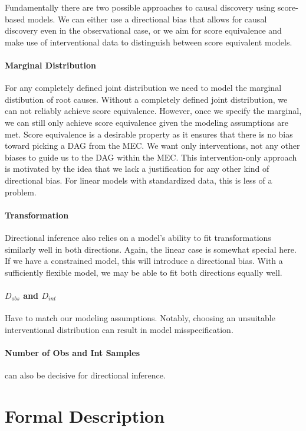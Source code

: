 \documentclass{article}
\begin{document}
Fundamentally there are two possible approaches to causal discovery using score-based models. We can either use a directional bias that allows for causal discovery even in the observational case, or we aim for score equivalence and make use of interventional data to distinguish between score equivalent models.

\paragraph{Marginal Distribution}
For any completely defined joint distribution we need to model the marginal distibution of root causes. Without a completely defined joint distribution, we can not reliably achieve score equivalence. However, once we specify the marginal, we can still only achieve score equivalence given the modeling assumptions are met. Score equivalence is a desirable property as it ensures that there is no bias toward picking a DAG from the MEC. We want only interventions, not any other biases to guide us to the DAG within the MEC. This intervention-only approach is motivated by the idea that we lack a justification for any other kind of directional bias. For linear models with standardized data, this is less of a problem.

\paragraph{Transformation}
Directional inference also relies on a model's ability to fit transformations similarly well in both directions. Again, the linear case is somewhat special here. If we have a constrained model, this will introduce a directional bias. With a sufficiently flexible model, we may be able to fit both directions equally well.

\paragraph{$D_{obs}$ and $D_{int}$}
Have to match our modeling assumptions. Notably, choosing an unsuitable interventional distribution can result in model misspecification.

\paragraph{Number of Obs and Int Samples} can also be decisive for directional inference.

\section{Formal Description}
\end{document}
